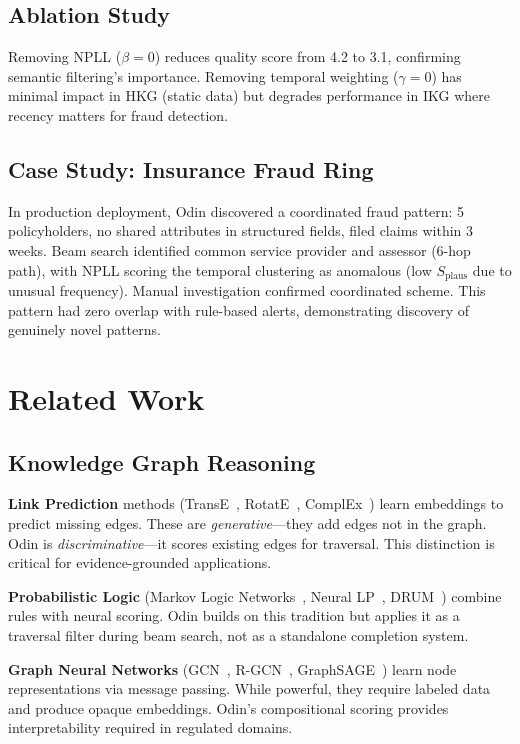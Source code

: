 \documentclass[10pt,twocolumn]{article}
\begin{document}
\subsection{Ablation Study}

Removing NPLL ($\beta=0$) reduces quality score from 4.2 to 3.1, confirming semantic filtering's importance. Removing temporal weighting ($\gamma=0$) has minimal impact in HKG (static data) but degrades performance in IKG where recency matters for fraud detection.

\subsection{Case Study: Insurance Fraud Ring}

In production deployment, Odin discovered a coordinated fraud pattern: 5 policyholders, no shared attributes in structured fields, filed claims within 3 weeks. Beam search identified common service provider and assessor (6-hop path), with NPLL scoring the temporal clustering as anomalous (low $S_{\text{plaus}}$ due to unusual frequency). Manual investigation confirmed coordinated scheme. This pattern had zero overlap with rule-based alerts, demonstrating discovery of genuinely novel patterns.

\section{Related Work}

\subsection{Knowledge Graph Reasoning}

\textbf{Link Prediction} methods (TransE~\cite{bordes2013translating}, RotatE~\cite{sun2019rotate}, ComplEx~\cite{trouillon2016complex}) learn embeddings to predict missing edges. These are \textit{generative}---they add edges not in the graph. Odin is \textit{discriminative}---it scores existing edges for traversal. This distinction is critical for evidence-grounded applications.

\textbf{Probabilistic Logic} (Markov Logic Networks~\cite{richardson2006markov}, Neural LP~\cite{yang2017differentiable}, DRUM~\cite{sadeghian2019drum}) combine rules with neural scoring. Odin builds on this tradition but applies it as a traversal filter during beam search, not as a standalone completion system.

\textbf{Graph Neural Networks} (GCN~\cite{kipf2016semi}, R-GCN~\cite{schlichtkrull2018modeling}, GraphSAGE~\cite{hamilton2017inductive}) learn node representations via message passing. While powerful, they require labeled data and produce opaque embeddings. Odin's compositional scoring provides interpretability required in regulated domains.
\end{document}
